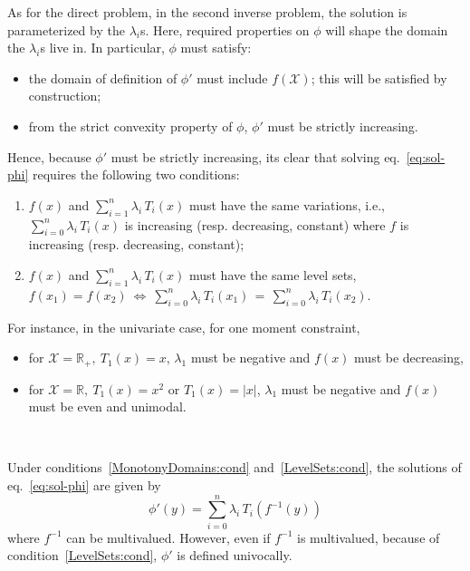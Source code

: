 \documentclass[entropy,article,submit,moreauthors,pdftex]{Definitions/mdpi}
\def\Rset{\mathbb{R}}%
\def\X{\mathcal{X}}%
\begin{document}
As  for the  direct problem,  in  the second  inverse problem,  the solution  is
parameterized  by the  $\lambda_i$s. Here,  required properties  on $\phi$  will
shape the domain the $\lambda_i$s live in. In particular, $\phi$ must satisfy:
%
\begin{itemize}
\item the  domain of definition  of $\phi'$ must  include $f(\X)$; this  will be
  satisfied by construction;
%
\item from  the strict convexity  property of  $\phi$, $\phi'$ must  be strictly
  increasing.
\end{itemize}
%
Hence,  because $\phi'$  must be  strictly  increasing, its  clear that  solving
eq.~\eqref{eq:sol-phi} requires the following two conditions:
%
\begin{enumerate}[label=(C\arabic*)]
\item\label{MonotonyDomains:cond}   $f(x)$   and   $\displaystyle   \sum_{i=1}^n
  \lambda_i  \, T_i(x)$  must  have the  same  variations, i.e.,  $\displaystyle
  \sum_{i=0}^n \lambda_i \, T_i(x)$  is increasing (resp.  decreasing, constant)
  where $f$ is increasing (resp. decreasing, constant);
%
\item\label{LevelSets:cond} $f(x)$ and  $\displaystyle \sum_{i=1}^n \lambda_i \,
  T_i(x)$ must have the same level sets,\newline $ \displaystyle f(x_1) = f(x_2)
  \: \Leftrightarrow \: \sum_{i=0}^n \lambda_i  \, T_i(x_1) \, = \, \sum_{i=0}^n
  \lambda_i \, T_i(x_2)$.
\end{enumerate}
%
For instance, in the univariate case, for one moment constraint,
%
\begin{itemize}
\item for $\X = \Rset_+, \: T_1(x) = x$, $\lambda_1$ must be negative and $f(x)$
  must be decreasing,
%
\item for $\X =  \Rset, \: T_1(x) = x^2$ or $T_1(x) =  |x|$, $\lambda_1$ must be
  negative and $f(x)$ must be even and unimodal.
\end{itemize}

\

Under   conditions~\ref{MonotonyDomains:cond}    and~\ref{LevelSets:cond},   the
solutions of eq.~\eqref{eq:sol-phi} are given by
%
\begin{equation}\label{eq:derivative-phi}
\phi'(y) = \sum_{i=0}^n \lambda_i \, T_i\!\left(f^{-1}(y)\right)
\end{equation}
%
where $f^{-1}$  can be  multivalued. However, even  if $f^{-1}$  is multivalued,
because of condition~\ref{LevelSets:cond}, $\phi'$ is defined univocally.
\end{document}
